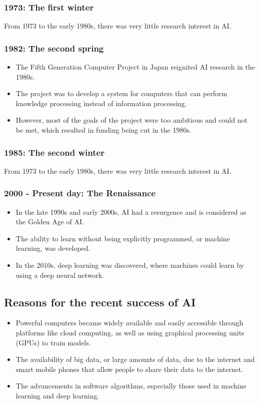 \documentclass[11pt]{article}
\begin{document}
\subsubsection{1973: The first winter}
\label{sec:orgb1ac296}
From 1973 to the early 1980s, there was very little research interest in AI.

\subsubsection{1982: The second spring}
\label{sec:orge7a5f44}
\begin{itemize}
\item The Fifth Generation Computer Project in Japan reignited AI research in the 1980s.
\item The project was to develop a system for computers that can perform knowledge processing instead of information processing.
\item However, most of the goals of the project were too ambitious and could not be met, which resulted in funding being cut in the 1980s.
\end{itemize}

\subsubsection{1985: The second winter}
\label{sec:org1af7a8a}
From 1973 to the early 1980s, there was very little research interest in AI.

\subsubsection{2000 - Present day: The Renaissance}
\label{sec:orgf13a76d}
\begin{itemize}
\item In the late 1990s and early 2000s, AI had a resurgence and is considered as the Golden Age of AI.
\item The ability to learn without being explicitly programmed, or machine learning, was developed.
\item In the 2010s, deep learning was discovered, where machines could learn by using a deep neural network.
\end{itemize}

\subsection{Reasons for the recent success of AI}
\label{sec:org1cb1ef2}
\begin{itemize}
\item Powerful computers became widely available and easily accessible through platforms like cloud computing, as well as using graphical processing units (GPUs) to train models.
\item The availability of big data, or large amounts of data, due to the internet and smart mobile phones that allow people to share their data to the internet.
\item The advancements in software algorithms, especially those used in machine learning and deep learning.
\end{itemize}
\end{document}
